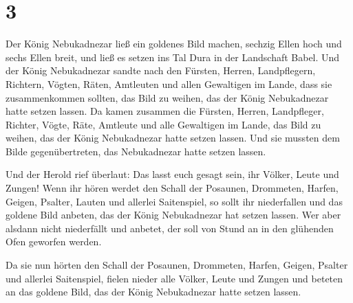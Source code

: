 \hypertarget{section-2}{%
\section{3}\label{section-2}}

 Der König Nebukadnezar ließ ein goldenes Bild machen,
sechzig Ellen hoch und sechs Ellen breit, und ließ es setzen ins Tal
Dura in der Landschaft Babel.  Und der König Nebukadnezar
sandte nach den Fürsten, Herren, Landpflegern, Richtern, Vögten, Räten,
Amtleuten und allen Gewaltigen im Lande, dass sie zusammenkommen
sollten, das Bild zu weihen, das der König Nebukadnezar hatte setzen
lassen.  Da kamen zusammen die Fürsten, Herren,
Landpfleger, Richter, Vögte, Räte, Amtleute und alle Gewaltigen im
Lande, das Bild zu weihen, das der König Nebukadnezar hatte setzen
lassen. Und sie mussten dem Bilde gegenübertreten, das Nebukadnezar
hatte setzen lassen.

 Und der Herold rief überlaut: Das lasst euch gesagt sein,
ihr Völker, Leute und Zungen!  Wenn ihr hören werdet den
Schall der Posaunen, Drommeten, Harfen, Geigen, Psalter, Lauten und
allerlei Saitenspiel, so sollt ihr niederfallen und das goldene Bild
anbeten, das der König Nebukadnezar hat setzen lassen. 
Wer aber alsdann nicht niederfällt und anbetet, der soll von Stund an in
den glühenden Ofen geworfen werden.

 Da sie nun hörten den Schall der Posaunen, Drommeten,
Harfen, Geigen, Psalter und allerlei Saitenspiel, fielen nieder alle
Völker, Leute und Zungen und beteten an das goldene Bild, das der König
Nebukadnezar hatte setzen lassen.

